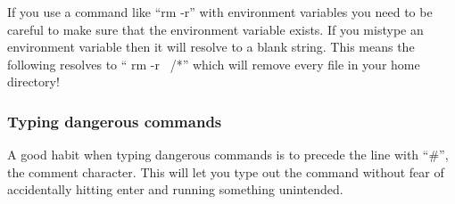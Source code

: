 If you use a command like ``rm -r'' with environment variables you need to be careful to make sure that the environment variable exists. If you mistype an environment variable then it will resolve to a blank string. This means the following resolves to `` rm -r ~/*'' which will remove every file in your home directory!

\begin{prompt}
\end{prompt}

\subsubsection{Typing dangerous commands}
A good habit when typing dangerous commands is to precede the line with ``#'', the comment character. This will let you type out the command without fear of accidentally hitting enter and running something unintended.


